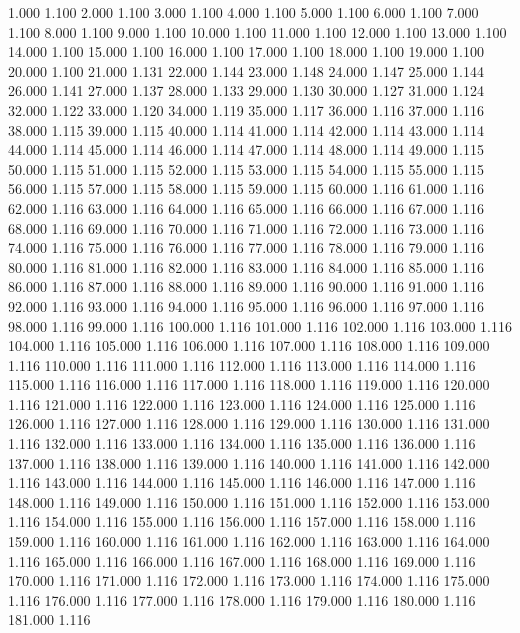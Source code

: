1.000 1.100 
2.000 1.100 
3.000 1.100 
4.000 1.100 
5.000 1.100 
6.000 1.100 
7.000 1.100 
8.000 1.100 
9.000 1.100 
10.000 1.100 
11.000 1.100 
12.000 1.100 
13.000 1.100 
14.000 1.100 
15.000 1.100 
16.000 1.100 
17.000 1.100 
18.000 1.100 
19.000 1.100 
20.000 1.100 
21.000 1.131 
22.000 1.144 
23.000 1.148 
24.000 1.147 
25.000 1.144 
26.000 1.141 
27.000 1.137 
28.000 1.133 
29.000 1.130 
30.000 1.127 
31.000 1.124 
32.000 1.122 
33.000 1.120 
34.000 1.119 
35.000 1.117 
36.000 1.116 
37.000 1.116 
38.000 1.115 
39.000 1.115 
40.000 1.114 
41.000 1.114 
42.000 1.114 
43.000 1.114 
44.000 1.114 
45.000 1.114 
46.000 1.114 
47.000 1.114 
48.000 1.114 
49.000 1.115 
50.000 1.115 
51.000 1.115 
52.000 1.115 
53.000 1.115 
54.000 1.115 
55.000 1.115 
56.000 1.115 
57.000 1.115 
58.000 1.115 
59.000 1.115 
60.000 1.116 
61.000 1.116 
62.000 1.116 
63.000 1.116 
64.000 1.116 
65.000 1.116 
66.000 1.116 
67.000 1.116 
68.000 1.116 
69.000 1.116 
70.000 1.116 
71.000 1.116 
72.000 1.116 
73.000 1.116 
74.000 1.116 
75.000 1.116 
76.000 1.116 
77.000 1.116 
78.000 1.116 
79.000 1.116 
80.000 1.116 
81.000 1.116 
82.000 1.116 
83.000 1.116 
84.000 1.116 
85.000 1.116 
86.000 1.116 
87.000 1.116 
88.000 1.116 
89.000 1.116 
90.000 1.116 
91.000 1.116 
92.000 1.116 
93.000 1.116 
94.000 1.116 
95.000 1.116 
96.000 1.116 
97.000 1.116 
98.000 1.116 
99.000 1.116 
100.000 1.116 
101.000 1.116 
102.000 1.116 
103.000 1.116 
104.000 1.116 
105.000 1.116 
106.000 1.116 
107.000 1.116 
108.000 1.116 
109.000 1.116 
110.000 1.116 
111.000 1.116 
112.000 1.116 
113.000 1.116 
114.000 1.116 
115.000 1.116 
116.000 1.116 
117.000 1.116 
118.000 1.116 
119.000 1.116 
120.000 1.116 
121.000 1.116 
122.000 1.116 
123.000 1.116 
124.000 1.116 
125.000 1.116 
126.000 1.116 
127.000 1.116 
128.000 1.116 
129.000 1.116 
130.000 1.116 
131.000 1.116 
132.000 1.116 
133.000 1.116 
134.000 1.116 
135.000 1.116 
136.000 1.116 
137.000 1.116 
138.000 1.116 
139.000 1.116 
140.000 1.116 
141.000 1.116 
142.000 1.116 
143.000 1.116 
144.000 1.116 
145.000 1.116 
146.000 1.116 
147.000 1.116 
148.000 1.116 
149.000 1.116 
150.000 1.116 
151.000 1.116 
152.000 1.116 
153.000 1.116 
154.000 1.116 
155.000 1.116 
156.000 1.116 
157.000 1.116 
158.000 1.116 
159.000 1.116 
160.000 1.116 
161.000 1.116 
162.000 1.116 
163.000 1.116 
164.000 1.116 
165.000 1.116 
166.000 1.116 
167.000 1.116 
168.000 1.116 
169.000 1.116 
170.000 1.116 
171.000 1.116 
172.000 1.116 
173.000 1.116 
174.000 1.116 
175.000 1.116 
176.000 1.116 
177.000 1.116 
178.000 1.116 
179.000 1.116 
180.000 1.116 
181.000 1.116 

